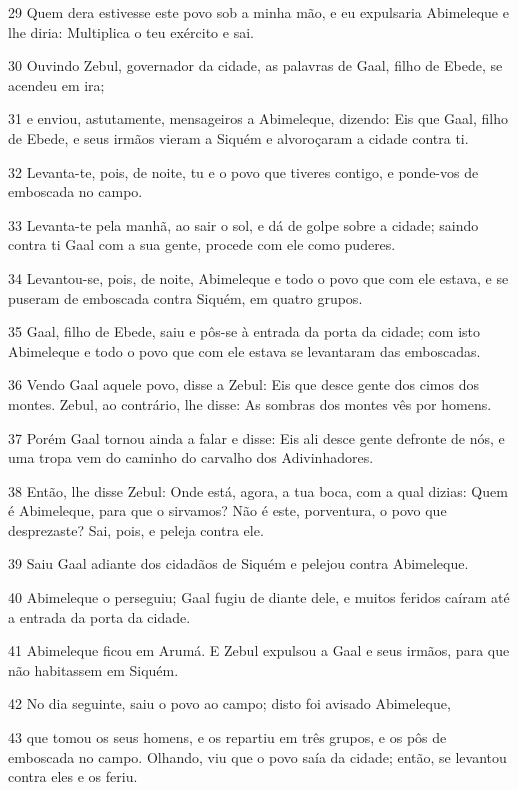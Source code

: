 \par 29 Quem dera estivesse este povo sob a minha mão, e eu expulsaria Abimeleque e lhe diria: Multiplica o teu exército e sai.
\par 30 Ouvindo Zebul, governador da cidade, as palavras de Gaal, filho de Ebede, se acendeu em ira;
\par 31 e enviou, astutamente, mensageiros a Abimeleque, dizendo: Eis que Gaal, filho de Ebede, e seus irmãos vieram a Siquém e alvoroçaram a cidade contra ti.
\par 32 Levanta-te, pois, de noite, tu e o povo que tiveres contigo, e ponde-vos de emboscada no campo.
\par 33 Levanta-te pela manhã, ao sair o sol, e dá de golpe sobre a cidade; saindo contra ti Gaal com a sua gente, procede com ele como puderes.
\par 34 Levantou-se, pois, de noite, Abimeleque e todo o povo que com ele estava, e se puseram de emboscada contra Siquém, em quatro grupos.
\par 35 Gaal, filho de Ebede, saiu e pôs-se à entrada da porta da cidade; com isto Abimeleque e todo o povo que com ele estava se levantaram das emboscadas.
\par 36 Vendo Gaal aquele povo, disse a Zebul: Eis que desce gente dos cimos dos montes. Zebul, ao contrário, lhe disse: As sombras dos montes vês por homens.
\par 37 Porém Gaal tornou ainda a falar e disse: Eis ali desce gente defronte de nós, e uma tropa vem do caminho do carvalho dos Adivinhadores.
\par 38 Então, lhe disse Zebul: Onde está, agora, a tua boca, com a qual dizias: Quem é Abimeleque, para que o sirvamos? Não é este, porventura, o povo que desprezaste? Sai, pois, e peleja contra ele.
\par 39 Saiu Gaal adiante dos cidadãos de Siquém e pelejou contra Abimeleque.
\par 40 Abimeleque o perseguiu; Gaal fugiu de diante dele, e muitos feridos caíram até a entrada da porta da cidade.
\par 41 Abimeleque ficou em Arumá. E Zebul expulsou a Gaal e seus irmãos, para que não habitassem em Siquém.
\par 42 No dia seguinte, saiu o povo ao campo; disto foi avisado Abimeleque,
\par 43 que tomou os seus homens, e os repartiu em três grupos, e os pôs de emboscada no campo. Olhando, viu que o povo saía da cidade; então, se levantou contra eles e os feriu.
